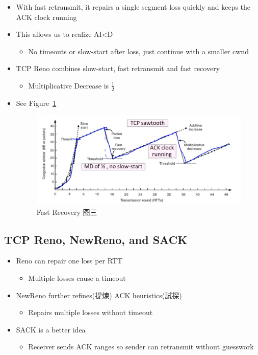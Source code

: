 \documentclass[12pt]{ctexart}   %
\begin{document}
\begin{itemize}
		 \item With fast retransmit, it repairs a single segment loss quickly and keeps the ACK clock running
		 
		 \item This allows us to realize AI<D
		 \begin{itemize}
		 	\item No timeouts or slow-start after loss, just continue with a smaller cwnd
		 \end{itemize}
		 
		 \item TCP Reno combines slow-start, fast retransmit and fast recovery
		 \begin{itemize}
		 	\item Multiplicative Decrease is $\frac{1}{2}$
		 \end{itemize}
		 \item See Figure~\ref{fig:7-7-6}
		  
		 \begin{figure}[h!] %
		\centering
		 \includegraphics[scale=0.7]{images/7-7-6}
		\caption{ Fast Recovery 图三 }
		 \label{fig:7-7-6}
		 \end{figure}
	\end{itemize}
	
	\subsection{TCP Reno, NewReno, and SACK}
	\begin{itemize}
		\item Reno can repair one loss per RTT
		\begin{itemize}
			\item Multiple losses cause a timeout
		\end{itemize}
		
		\item NewReno further refines(提煉) ACK heuristics(試探)
		\begin{itemize}
			\item Repairs multiple losses without timeout
		\end{itemize}
		
		\item SACK is a better idea
		\begin{itemize}
			\item Receiver sends ACK ranges so sender can retransmit without guesswork
		\end{itemize}
	\end{itemize}
	
\end{document}

